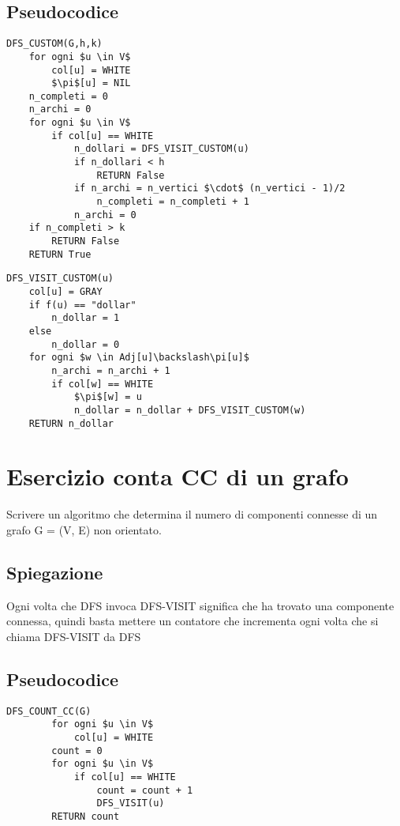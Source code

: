 \documentclass[12pt, a4paper, openany]{book}
\begin{document}
	\subsection*{Pseudocodice}
	\begin{lstlisting}[mathescape=true]
DFS_CUSTOM(G,h,k)
    for ogni $u \in V$
        col[u] = WHITE
        $\pi$[u] = NIL
    n_completi = 0
    n_archi = 0
    for ogni $u \in V$
        if col[u] == WHITE
            n_dollari = DFS_VISIT_CUSTOM(u)
            if n_dollari < h
                RETURN False
            if n_archi = n_vertici $\cdot$ (n_vertici - 1)/2
                n_completi = n_completi + 1
            n_archi = 0
    if n_completi > k
        RETURN False
    RETURN True
\end{lstlisting}

	\begin{lstlisting}[mathescape=true]
DFS_VISIT_CUSTOM(u)
    col[u] = GRAY
    if f(u) == "dollar"
        n_dollar = 1
    else
        n_dollar = 0
    for ogni $w \in Adj[u]\backslash\pi[u]$
        n_archi = n_archi + 1
        if col[w] == WHITE
            $\pi$[w] = u
            n_dollar = n_dollar + DFS_VISIT_CUSTOM(w)
    RETURN n_dollar
\end{lstlisting}

	\section{Esercizio conta CC di un grafo}
	Scrivere un algoritmo che determina il numero di componenti connesse di un grafo G =
	(V, E) non orientato.

	\subsection*{Spiegazione}
	Ogni volta che DFS invoca DFS-VISIT significa che ha trovato una componente connessa, quindi basta mettere un contatore che incrementa ogni volta che si chiama DFS-VISIT da DFS
	\subsection*{Pseudocodice}
	\begin{lstlisting}[mathescape=true]
    DFS_COUNT_CC(G)
        for ogni $u \in V$
            col[u] = WHITE
        count = 0
        for ogni $u \in V$
            if col[u] == WHITE
                count = count + 1
                DFS_VISIT(u)
        RETURN count
\end{lstlisting}
\end{document}
